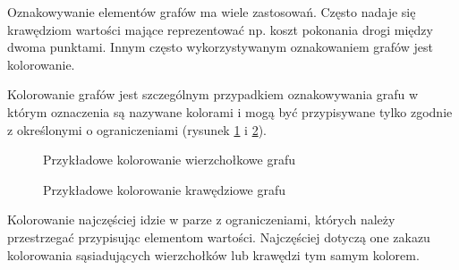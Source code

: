     Oznakowywanie elementów grafów ma wiele zastosowań. Często nadaje się krawędziom wartości mające reprezentować np.
     koszt pokonania drogi między dwoma punktami. Innym często wykorzystywanym oznakowaniem grafów jest kolorowanie.   
   
    \begin{definition}
      Kolorowanie grafów jest szczególnym przypadkiem oznakowywania grafu w którym oznaczenia są nazywane kolorami i mogą być przypisywane tylko zgodnie z określonymi o
       ograniczeniami (rysunek \ref{kolor3} i \ref{kolor4}). 
    \end{definition}

    \begin{figure}[H]
      \centering
        \caption{Przykładowe kolorowanie wierzchołkowe grafu}
        \label{kolor3}
     \end{figure}

    \begin{figure}[H]
      \centering
        \caption{Przykładowe kolorowanie krawędziowe grafu}
        \label{kolor4}
     \end{figure}

     Kolorowanie najczęściej idzie w parze z ograniczeniami, których należy przestrzegać przypisując elementom wartości.
     Najczęściej dotyczą one zakazu kolorowania sąsiadujących wierzchołków lub krawędzi tym samym kolorem. 
	
